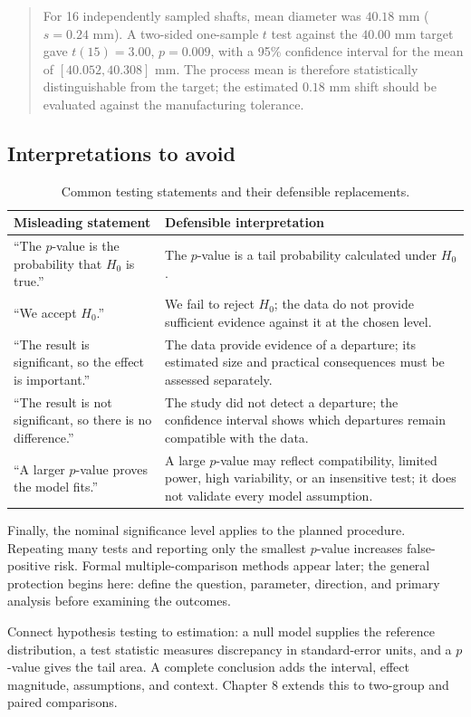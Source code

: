 \begin{quote}
For 16 independently sampled shafts, mean diameter was $40.18$ mm ($s=0.24$ mm). A two-sided one-sample $t$ test against the $40.00$ mm target gave $t(15)=3.00$, $p=0.009$, with a 95\% confidence interval for the mean of $[40.052,40.308]$ mm. The process mean is therefore statistically distinguishable from the target; the estimated $0.18$ mm shift should be evaluated against the manufacturing tolerance.
\end{quote}

\subsection{Interpretations to avoid}

\begin{table}[htbp]
\centering
\caption{Common testing statements and their defensible replacements.}
\label{tab:pvalue-interpretations}
\begin{tabularx}{\textwidth}{@{}>{\raggedright\arraybackslash}X>{\raggedright\arraybackslash}X@{}}
\toprule
Misleading statement & Defensible interpretation \\
\midrule
``The $p$-value is the probability that $H_0$ is true.'' & The $p$-value is a tail probability calculated under $H_0$. \\
``We accept $H_0$.'' & We fail to reject $H_0$; the data do not provide sufficient evidence against it at the chosen level. \\
``The result is significant, so the effect is important.'' & The data provide evidence of a departure; its estimated size and practical consequences must be assessed separately. \\
``The result is not significant, so there is no difference.'' & The study did not detect a departure; the confidence interval shows which departures remain compatible with the data. \\
``A larger $p$-value proves the model fits.'' & A large $p$-value may reflect compatibility, limited power, high variability, or an insensitive test; it does not validate every model assumption. \\
\bottomrule
\end{tabularx}
\end{table}

\FloatBarrier

Finally, the nominal significance level applies to the planned procedure. Repeating many tests and reporting only the smallest $p$-value increases false-positive risk. Formal multiple-comparison methods appear later; the general protection begins here: define the question, parameter, direction, and primary analysis before examining the outcomes.

Connect hypothesis testing to estimation: a null model supplies the reference distribution, a test statistic measures discrepancy in standard-error units, and a $p$-value gives the tail area. A complete conclusion adds the interval, effect magnitude, assumptions, and context. Chapter 8 extends this to two-group and paired comparisons.
